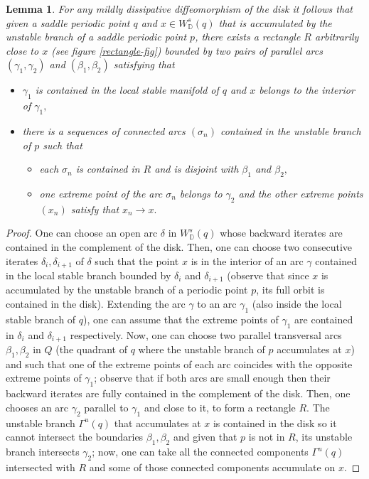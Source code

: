 \documentclass[a4paper,11pt]{article}
\newtheorem{lemma}{Lemma}
\theoremstyle{definition}
\def\DD{{\mathbb D}}
\def\ga{\gamma}
\def\Ga{\Gamma}
\def\be{\beta}
\def\Ga{\Gamma}
\def\si{\sigma}
\begin{document}
\begin{lemma}\label{rectangle} For any  mildly dissipative diffeomorphism of the disk it follows that given a saddle periodic point $q$ and $x\in W^s_{\DD}(q)$ that is accumulated by the unstable branch of a saddle periodic point $p$, there exists a rectangle $R$ arbitrarily close to $x$ (see figure \ref{rectangle-fig}) bounded by two pairs of parallel  arcs $(\ga_1, \ga_2)$ and $(\be_1, \be_2)$ satisfying that
\begin{itemize}
    \item[--] $\ga_1$ is contained in the local stable manifold of $q$ and $x$ belongs to the interior of $\ga_1,$
    \item[--] there is a sequences of connected arcs $(\si_n)$ contained in the unstable branch of $p$ such that 
    \begin{itemize}
     \item[--] each $\si_n$ is contained in $R$ and is disjoint with $\be_1$ and $\be_2,$
     \item[--] one extreme point of the arc $\si_n$ belongs to $\ga_2$ and the other extreme points $(x_n)$ satisfy that $x_n\to x.$

    
    
    \end{itemize}

\end{itemize}

\end{lemma}

\begin{proof} One can choose an open arc $\delta$ in $W^s_\DD(q)$ whose backward iterates are contained in the complement of the disk. Then, one can choose two consecutive iterates $\delta_i, \delta_{i+1}$ of $\delta$ such that the point $x$ is in the interior of an  arc $\gamma$ contained in the local stable branch bounded by $\delta_i$ and $\delta_{i+1}$ (observe that since  $x$ is accumulated by the unstable branch of a periodic point $p$, its full orbit is contained in the disk). Extending the arc $\gamma$ to an arc $\gamma_1$  (also inside the local stable branch of $q$), one can assume that the extreme points of $\gamma_1$ are contained in $\delta_i$ and $\delta_{i+1}$ respectively. Now, one can choose two parallel transversal  arcs $\beta_1, \beta_2$ in $Q$ (the quadrant of $q$ where the unstable branch of $p$ accumulates at $x$) and such that one of the  extreme points of each arc coincides with the opposite extreme points of $\gamma_1$; observe that if both arcs are small enough then their backward iterates are fully contained in the complement of the disk. Then, one chooses an arc $\gamma_2$ parallel to $\gamma_1$ and close to it, to form a rectangle $R$. The unstable branch $\Ga^u(q)$ that  accumulates at $x$ is contained in the disk so it cannot intersect the boundaries $\beta_1, \beta_2$ and given that $p$ is not in $R$, its unstable branch intersects  $\gamma_2$; now, one can take all the connected components $\Ga^u(q)$ intersected with $R$ and   some of those connected components  accumulate on $x.$
    
\end{proof}
\end{document}
